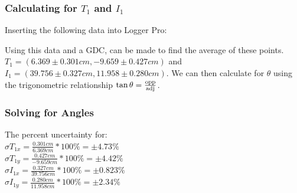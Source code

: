 \documentclass[12pt]{article}
\begin{document}
\subsubsection{Calculating for $T_{1}$ and $I_{1}$}
Inserting the following data into Logger Pro:
\begin{center}
\begin{figure}[H]
\centering
{}
\end{figure}
\end{center}
Using this data and a GDC, can be made to find the average of these points. $T_{1} = (6.369\pm0.301cm, -9.659\pm0.427cm)$ and $I_{1} = (39.756\pm0.327cm, 11.958\pm0.280cm)$. We can then calculate for $\theta{}$ using the trigonometric relationship $\tan{\theta{}} = \ce{\frac{opp}{adj}}$.

\pagebreak
\subsubsection{Solving for Angles}
The percent uncertainty for:\\
$\sigma{}T_{1x} = \frac{0.301cm}{6.369cm} * 100\% = \pm4.73\%$\\
$\sigma{}T_{1y} = \frac{0.427cm}{-9.659cm} * 100\% = \pm4.42\%$\\
$\sigma{}I_{1x} = \frac{0.327cm}{39.756cm} * 100\% = \pm0.823\%$\\
$\sigma{}I_{1y} = \frac{0.280cm}{11.958cm} * 100\% = \pm2.34\%$
\end{document}
